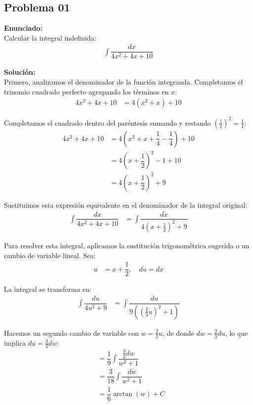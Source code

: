 \subsection*{Problema 01}

\noindent \textbf{Enunciado:} \\
Calcular la integral indefinida:
\begin{align*}
\int \dfrac{dx}{4x^2 + 4x + 10}
\end{align*}

\noindent \textbf{Solución:} \\
Primero, analizamos el denominador de la función integranda. Completamos el trinomio cuadrado perfecto agrupando los términos en $x$:
\begin{align*}
4x^2 + 4x + 10 &= 4\left(x^2 + x\right) + 10
\end{align*}

\noindent Completamos el cuadrado dentro del paréntesis sumando y restando $\left(\frac{1}{2}\right)^2 = \frac{1}{4}$:
\begin{align*}
4x^2 + 4x + 10 &= 4\left(x^2 + x + \dfrac{1}{4} - \dfrac{1}{4}\right) + 10 \\
&= 4\left(x + \dfrac{1}{2}\right)^2 - 1 + 10 \\
&= 4\left(x + \dfrac{1}{2}\right)^2 + 9
\end{align*}

\noindent Sustituimos esta expresión equivalente en el denominador de la integral original:
\begin{align*}
\int \dfrac{dx}{4x^2 + 4x + 10} &= \int \dfrac{dx}{4\left(x + \frac{1}{2}\right)^2 + 9}
\end{align*}

\noindent Para resolver esta integral, aplicamos la sustitución trigonométrica sugerida o un cambio de variable lineal. Sea:
\begin{align*}
u &= x + \dfrac{1}{2}, \quad du = dx
\end{align*}

\noindent La integral se transforma en:
\begin{align*}
\int \dfrac{du}{4u^2 + 9} &= \int \dfrac{du}{9 \left(\left(\frac{2}{3}u\right)^2 + 1\right)}
\end{align*}

\noindent Hacemos un segundo cambio de variable con $w = \frac{2}{3}u$, de donde $dw = \frac{2}{3}du$, lo que implica $du = \frac{3}{2}dw$:
\begin{align*}
&= \dfrac{1}{9} \int \dfrac{\frac{3}{2} dw}{w^2 + 1} \\
&= \dfrac{3}{18} \int \dfrac{dw}{w^2 + 1} \\
&= \dfrac{1}{6} \arctan(w) + C
\end{align*}

